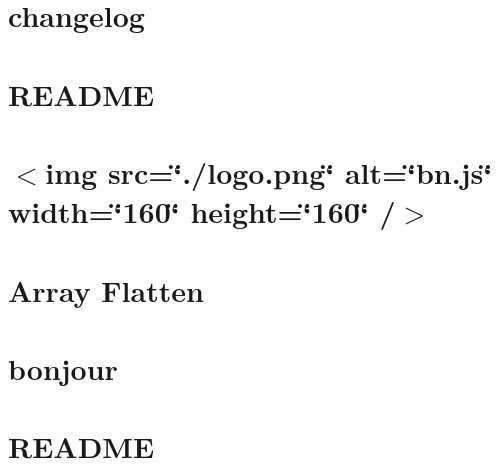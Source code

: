 \documentclass[twoside]{book}
\newcommand{\+}{\discretionary{\mbox{\scriptsize$\hookleftarrow$}}{}{}}
\begin{document}
\chapter{changelog}
\label{md__c_1_workspace_demo_src_main_script_node_modules_bluebird_changelog}

\chapter{R\+E\+A\+D\+ME}
\label{md__c_1_workspace_demo_src_main_script_node_modules_bluebird__r_e_a_d_m_e}

\chapter{$<$img src=\char`\"{}./logo.\+png\char`\"{} alt=\char`\"{}bn.\+js\char`\"{} width=\char`\"{}160\char`\"{} height=\char`\"{}160\char`\"{} /$>$}
\label{md__c_1_workspace_demo_src_main_script_node_modules_bn_8js__r_e_a_d_m_e}

\chapter{Array Flatten}
\label{md__c_1_workspace_demo_src_main_script_node_modules_bonjour_node_modules_array-flatten__r_e_a_d_m_e}

\chapter{bonjour}
\label{md__c_1_workspace_demo_src_main_script_node_modules_bonjour__r_e_a_d_m_e}

\chapter{R\+E\+A\+D\+ME}
\label{md__c_1_workspace_demo_src_main_script_node_modules_boolbase__r_e_a_d_m_e}

\end{document}
